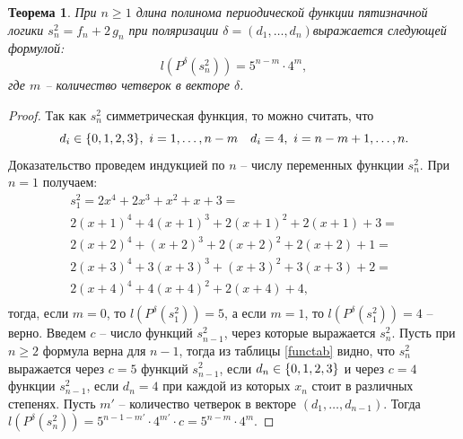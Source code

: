 \documentclass[bibliography=totoc, a4paper, 14pt]{extarticle}
\newtheorem{myth}{Теорема}
\def\in{\mathchar"3232\nobreak\discretionary{}{\usefont{OMS}{cmsy}{m}{n}\char50}{}}
\begin{document}
\begin{myth}
\label{ths2}
При $n \geqslant 1$ длина полинома периодической функции пятизначной логики ${s^2_n = f_n + 2\,g_n}$
при поляризации $\delta = (d_1,\ldots,d_n)$выражается следующей формулой:
$$ l(P^{\delta}(s^2_n)) = 5^{n-m} \cdot 4^m ,$$
где $m$ -- количество четверок в векторе $\delta$.
\end{myth}
\begin{proof}
Так как $s^2_n$ симметрическая функция, то можно считать, что
$$d_i \in \{0,1,2,3\},\ i=1,\dots,n-m \quad d_i = 4,\ i=n-m+1,\dots,n.$$
Доказательство проведем индукцией по $n$ -- числу переменных функции $s^2_n$.
При $n = 1$ получаем:
$$ \begin{array}{l}
s^2_1 = 2x^4 + 2x^3 + x^2 + x + 3 = \\
2(x+1)^4 + 4(x+1)^3 + 2(x+1)^2 + 2(x+1) + 3 = \\
2(x+2)^4 + (x+2)^3 + 2(x+2)^2 + 2(x+2) + 1 = \\
2(x+3)^4 + 3(x+3)^3 + (x+3)^2 + 3(x+3) + 2 = \\
2(x+4)^4 + 4(x+4)^2 + 2(x+4) + 4, \\
\end{array}$$
тогда, если $m=0$, то $l(P^{\delta}(s^2_1)) = 5$, а если $m=1$, то
$l(P^{\delta}(s^2_1))=4$ -- верно. Введем $c$ -- число функций $s^2_{n-1}$, через которые
выражается $s^2_n$. Пусть при $n \geqslant 2$ формула верна для ${n-1}$, тогда из таблицы
\ref{functab} видно, что $s^2_n$ выражается через $c=5$ функций $s^2_{n-1}$, если
${d_n \in \{0,1,2,3\}}$ и через $c=4$ функции $s^2_{n-1}$, если $d_n = 4$ при каждой из которых
$x_n$ стоит в различных степенях. Пусть $m'$ -- количество четверок в векторе $(d_1,\dots,d_{n-1})$.
Тогда ${l(P^{\delta}(s^2_n)) = 5^{n-1-m'} \cdot 4^{m'} \cdot c = 5^{n-m}\cdot4^m}$.
\end{proof}
\end{document}
